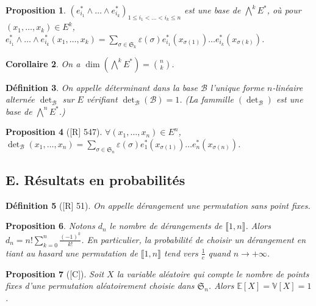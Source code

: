 \documentclass[10pt, a4paper, parskip=full, twoside, twocolumn]{report}
\newtheorem{definition}{Définition}
\newtheorem{proposition}[definition]{Proposition}
\newtheorem{corollary}[definition]{Corollaire}
\begin{document}
\begin{proposition}
	$\left(e_{i_1}^*\wedge \dots \wedge e_{i_k}^*\right)_{1\leq i_1 < \dots < i_k\leq n}$ est une base de $\bigwedge^kE^*$, où pour $(x_1,\dots,x_k)\in E^k$,
	$e_{i_1}^*\wedge \dots \wedge e_{i_k}^*(x_1,\dots,x_k) = \sum_{\sigma\in\mathfrak{S}_k} \varepsilon(\sigma) e_{i_1}^*(x_{\sigma(1)}) \dots e_{i_k}^*(x_{\sigma(k)})$.
\end{proposition}

\begin{corollary}
	On a $\dim\left(\bigwedge^kE^*\right) = {n \choose k}$.
\end{corollary}

\begin{definition}
	On appelle \emph{déterminant dans la base $\mathcal{B}$} l'unique forme $n$-linéaire alternée $\det_{\mathcal{B}}$ sur $E$ vérifiant
	$\det_{\mathcal{B}}(\mathcal{B}) = 1$. (La fammille $\left(\det_{\mathcal{B}}\right)$ est une base de $\bigwedge^n E^*$.)
\end{definition}

\begin{proposition}[\textnormal{[R] 547}]
	$\forall(x_1,\dots, x_n)\in E^n$, $\det_{\mathcal{B}}(x_1,\dots,x_n) = \sum_{\sigma\in\mathfrak{S}_n} \varepsilon(\sigma)e_1^*(x_{\sigma(1)})\dots e_n^*(x_{\sigma(n)})$.
\end{proposition}

\subsection*{E. Résultats en probabilités}

\begin{definition}[\textnormal{[R] 51}]
	On appelle \emph{dérangement} une permutation sans point fixes.
\end{definition}

\begin{proposition}
	Notons $d_n$ le nombre de dérangements de $\llbracket 1,n\rrbracket$.
	Alors $d_n = n!\sum_{k=0}^{n}\frac{(-1)^k}{k!}$. En particulier, la probabilité
	de choisir un dérangement en tiant au hasard une permutation de $\llbracket 1,n\rrbracket$ tend vers $\frac{1}{e}$ quand $n\to +\infty$.
\end{proposition}

\begin{proposition}[\textnormal{[C]}]
	Soit $X$ la variable aléatoire qui compte le nombre de points fixes d'une permutation aléatoirement choisie dans $\mathfrak{S}_n$.
	Alors $\mathbb{E}[X] = \mathbb{V}[X] = 1$.
\end{proposition}
\end{document}
